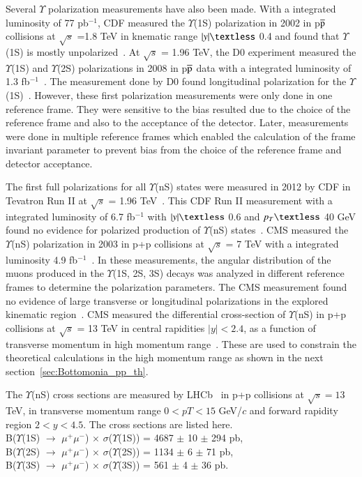 Several $\Upsilon$ polarization measurements have also been made. With a integrated luminosity
of 77 pb$^{-1}$, CDF measured the $\Upsilon$(1S) polarization in 2002 in 
p$\overline{\rm p}$ collisions at $\surd s$ =1.8 TeV in knematic range
$|y|\textless$ 0.4 and found that $\Upsilon$(1S) is mostly unpolarized~\cite{CDF:2001fdy}.
At $\surd s$  = 1.96 TeV, the D0 experiment measured the $\Upsilon$(1S) and
$\Upsilon$(2S) polarizations in 2008 in p$\overline{\rm p}$ data
with a integrated luminosity of 1.3 fb$^{-1}$~\cite{D0:2008yos}. The measurement done by D0 found
longitudinal polarization for the $\Upsilon$(1S)~\cite{D0:2008yos}.
However, these first polarization measurements were only done in one reference frame.
They were sensitive to the bias resulted due to the choice of the reference frame
and also to the acceptance of the detector. Later, measurements were done in multiple
reference frames which enabled the calculation of the frame invariant parameter to
prevent bias from the choice of the reference frame and detector acceptance.

The first full polarizations for all $\Upsilon$(nS) states were measured in 2012 by
CDF in Tevatron Run II at $\surd s$  = 1.96 TeV~\cite{CDF:2011ag}.
This CDF Run II measurement with a integrated luminosity of 6.7 fb$^{-1}$
with $|y|\textless$ 0.6 and $p_{T}\textless$ 40 GeV found no evidence for
polarized production of $\Upsilon$(nS) states~\cite{CDF:2011ag}.
CMS measured the $\Upsilon$(nS) polarization in 2003 in p+p collisions
at $\surd s$  = 7 TeV with a integrated luminosity 4.9 fb$^{-1}$~\cite{CMS:2012bpf}.
In these measurements, the angular distribution of the muons produced in
the $\Upsilon$(1S, 2S, 3S) decays was analyzed in different reference frames to determine the
polarization parameters. The CMS measurement found no evidence of large transverse or
longitudinal polarizations in the explored kinematic region~\cite{CMS:2012bpf}.
CMS measured the differential cross-section of $\Upsilon$(nS)
in p+p collisions at $\sqrt{s}$ = 13 TeV in central rapidities $|y|<2.4$,
as a function of transverse momentum in high momentum range~\cite{CMS:2017dju}.
These are used to constrain the theoretical calculations in the high
momentum range as shown in the next section~\ref{sec:Bottomonia_pp_th}.

The $\Upsilon$(nS) cross sections are measured by LHCb~\cite{LHCb:2018yzj}
in p+p collisions at $\sqrt{s}=13$ TeV, in transverse momentum
range $0 < pT < 15$ GeV/$c$ and forward rapidity region $2 < y < 4.5$.
The cross sections are listed here. \\
B($\Upsilon$(1S) $\rightarrow$ $\mu^+\mu^-$) $\times$ $\sigma$($\Upsilon$(1S)) = 4687 $\pm$ 10 $\pm$ 294 pb,\\
B($\Upsilon$(2S) $\rightarrow$ $\mu^+\mu^-$) $\times$ $\sigma$($\Upsilon$(2S)) = 1134 $\pm$ 6 $\pm$ 71 pb, \\
B($\Upsilon$(3S) $\rightarrow$ $\mu^+\mu^-$) $\times$ $\sigma$($\Upsilon$(3S)) = 561 $\pm$ 4 $\pm$ 36 pb. 


